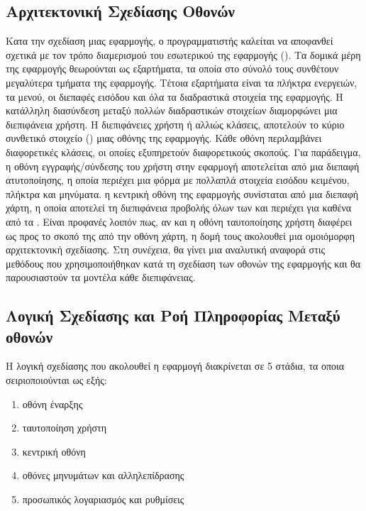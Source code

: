 \subsection{Αρχιτεκτονική Σχεδίασης Οθονών}
Κατα την σχεδίαση μιας  εφαρμογής, ο προγραμματιστής καλείται να αποφανθεί σχετικά με τον τρόπο διαμερισμού του εσωτερικού της εφαρμογής (). Τα δομικά μέρη της εφαρμογής θεωρούνται ως εξαρτήματα, τα οποία στο σύνολό τους συνθέτουν μεγαλύτερα τμήματα της εφαρμογής. Τέτοια εξαρτήματα είναι τα πλήκτρα ενεργειών, τα μενού, οι διεπαφές εισόδου και όλα τα διαδραστικά στοιχεία της εφαρμογής. Η κατάλληλη διασύνδεση μεταξύ πολλών διαδραστικών στοιχείων διαμορφώνει μια διεπιφάνεια χρήστη. Η διεπιφάνειες χρήστη ή αλλιώς κλάσεις, αποτελούν το κύριο συνθετικό στοιχείο () μιας οθόνης της εφαρμογής. Κάθε οθόνη περιλαμβάνει διαφορετικές κλάσεις, οι οποίες εξυπηρετούν διαφορετικούς σκοπούς. Για παράδειγμα, η οθόνη εγγραφής/σύνδεσης του χρήστη στην εφαρμογή αποτελείται από μια διεπαφή ατυτοποίησης, η οποία περιέχει μια φόρμα με πολλαπλά στοιχεία εισόδου κειμένου, πλήκτρα και μηνύματα. η κεντρική οθόνη της εφαρμογής συνίσταται από μια διεπαφή χάρτη, η οποία αποτελεί τη διεπιφάνεια προβολής όλων των  και περιέχει  για καθένα από τα .\newline
\indent
Είναι προφανές λοιπόν πως, αν και η οθόνη ταυτοποίησης χρήστη διαφέρει ως προς το σκοπό της από την οθόνη χάρτη, η δομή τους ακολουθεί μια ομοιόμορφη αρχιτεκτονική σχεδίασης. Στη συνέχεια, θα γίνει μια αναλυτική αναφορά στις μεθόδους που χρησιμοποιήθηκαν κατά τη σχεδίαση των οθονών της εφαρμογής και θα παρουσιαστούν τα μοντέλα κάθε διεπιφάνειας.

\subsection{Λογική Σχεδίασης και Ροή Πληροφορίας Μεταξύ οθονών}
Η λογική σχεδίασης που ακολουθεί η εφαρμογή διακρίνεται σε 5 στάδια, τα οποια σειριοποιούνται ως εξής:
\begin{enumerate}
    \item οθόνη έναρξης
    \item ταυτοποίηση χρήστη
    \item κεντρική οθόνη
    \item οθόνες μηνυμάτων και αλληλεπίδρασης
    \item προσωπικός λογαριασμός και ρυθμίσεις 
\end{enumerate}

